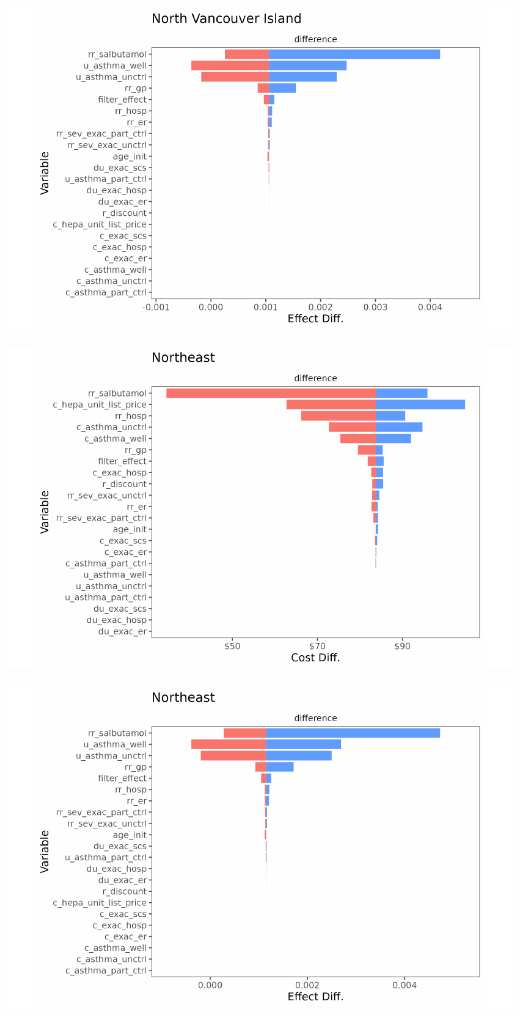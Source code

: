 \documentclass[
  number]{elsarticle}
\begin{document}
\includegraphics{index_files/figure-pdf/unnamed-chunk-9-16.pdf}

\includegraphics{index_files/figure-pdf/unnamed-chunk-9-17.pdf}

\includegraphics{index_files/figure-pdf/unnamed-chunk-9-18.pdf}
\end{document}
